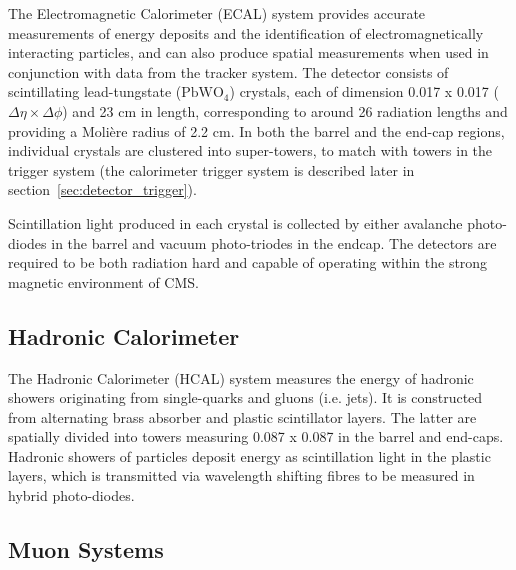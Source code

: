The Electromagnetic Calorimeter (ECAL) system provides accurate measurements of 
energy deposits and the identification of electromagnetically interacting 
particles, and can also produce spatial measurements when used in conjunction 
with data from the tracker system. The detector consists of scintillating
lead-tungstate
($\text{PbWO}_4$) crystals, each of dimension 0.017 x 0.017 ($\Delta \eta \times
\Delta \phi$) and 23 cm in length, corresponding to around 26 radiation lengths
and providing a Moli\`{e}re radius of 2.2 cm. In both the barrel and the
end-cap regions, individual crystals are clustered into super-towers, to match
with towers in the trigger system (the calorimeter trigger system is described
later in section~\ref{sec:detector_trigger}).

Scintillation light produced in each crystal is collected by either
avalanche photo-diodes in the barrel and vacuum photo-triodes in the
endcap. The detectors are required to be both radiation hard and capable of
operating within the strong magnetic environment of CMS.


\subsection{Hadronic Calorimeter}


The Hadronic Calorimeter (HCAL) system measures the energy of hadronic showers 
originating from single-quarks and gluons (i.e. jets). It is constructed from
alternating  brass absorber and plastic scintillator layers. The latter are spatially 
divided into towers measuring 0.087 x 0.087 in the barrel and end-caps. Hadronic
showers of particles deposit energy as scintillation light in the plastic layers,
which is transmitted via wavelength shifting fibres to be measured in hybrid
photo-diodes. 


\subsection{Muon Systems}


